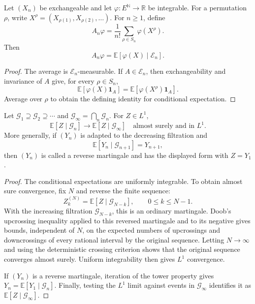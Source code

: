 \begin{thm}
Let $(X_n)$ be exchangeable and let
$\varphi:E^{\mathbb N}\to\mathbb R$ be integrable. For a permutation $\rho$,
write $X^\rho=(X_{\rho(1)},X_{\rho(2)},\ldots)$. For $n\geq1$, define
\[
A_n\varphi
 =\frac1{n!}\sum_{\rho\in S_n}\varphi(X^\rho).
\]
Then
\[
A_n\varphi=\mathbb E[\varphi(X)\mid\mathcal E_n].
\]
\end{thm}

\begin{proof}
The average is $\mathcal E_n$-measurable. If $A\in\mathcal E_n$, then
exchangeability and invariance of $A$ give, for every $\rho\in S_n$,
\[
\mathbb E[\varphi(X)\mathbf1_A]
 =\mathbb E[\varphi(X^\rho)\mathbf1_A].
\]
Average over $\rho$ to obtain the defining identity for conditional
expectation.
\end{proof}

\begin{thm}
Let $\mathcal G_1\supseteq\mathcal G_2\supseteq\cdots$ and
$\mathcal G_\infty=\bigcap_n\mathcal G_n$. For $Z\in L^1$,
\[
\mathbb E[Z\mid\mathcal G_n]
 \longrightarrow\mathbb E[Z\mid\mathcal G_\infty]
\quad\text{almost surely and in }L^1.
\]
More generally, if $(Y_n)$ is adapted to the decreasing filtration and
\[
\mathbb E[Y_n\mid\mathcal G_{n+1}]=Y_{n+1},
\]
then $(Y_n)$ is called a reverse martingale and has the displayed form with
$Z=Y_1$.
\end{thm}

\begin{proof}
The conditional expectations are uniformly integrable. To obtain almost sure
convergence, fix $N$ and reverse the finite sequence:
\[
Z_k^{(N)}=\mathbb E[Z\mid\mathcal G_{N-k}],
\qquad 0\leq k\leq N-1.
\]
With the increasing filtration $\mathcal G_{N-k}$, this is an ordinary
martingale. Doob's upcrossing inequality applied to this reversed martingale
and to its negative gives bounds, independent of $N$, on the expected numbers
of upcrossings and downcrossings of every rational interval by the original
sequence. Letting $N\to\infty$ and using the deterministic crossing criterion
shows that the original sequence converges almost surely. Uniform
integrability then gives $L^1$ convergence.

If $(Y_n)$ is a reverse martingale, iteration of the tower property gives
$Y_n=\mathbb E[Y_1\mid\mathcal G_n]$. Finally, testing the $L^1$ limit against
events in $\mathcal G_\infty$ identifies it as
$\mathbb E[Z\mid\mathcal G_\infty]$.
\end{proof}

